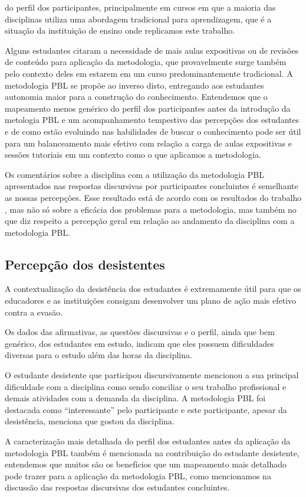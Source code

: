 do perfil dos participantes, principalmente em cursos em que a maioria
das disciplinas utiliza uma abordagem tradicional para aprendizagem, que
é a situação da instituição de ensino onde replicamos este trabalho.

Alguns estudantes citaram a necessidade de mais aulas
expositivas ou de revisões de conteúdo para aplicação
da metodologia, que provavelmente surge também pelo
contexto deles em estarem em um curso
predominantemente tradicional.
A metodologia \ac{PBL} se propõe ao inverso disto, entregando
aos estudantes autonomia maior para a construção
do conhecimento.
Entendemos que o mapeamento menos genérico do perfil
dos participantes antes da introdução da metologia \ac{PBL}
e um acompanhamento tempestivo das percepções dos estudantes
e de como estão evoluindo nas habilidades de buscar o conhecimento
pode ser útil para um balanceamento mais efetivo com
relação a carga de aulas expositivas e sessões tutoriais
em um contexto como o que aplicamos a metodologia.

Os comentários sobre a disciplina com a utilização da metodologia \ac{PBL}
apresentados nas respostas discursivas por participantes concluintes
é semelhante as nossas percepções.
Esse resultado está de acordo com os resultados do
trabalho \cite{sockalingam2011student}, mas não só sobre a eficácia
dos problemas para a metodologia, mas também no que diz respeito
a percepção geral em relação ao andamento da disciplina
com a metodologia \ac{PBL}.

\subsection{Percepção dos desistentes}

A contextualização da desistência dos estudantes é extremamente útil
para que os educadores e as instituições consigam desenvolver um
plano de ação mais efetivo contra a evasão.

Os dados das afirmativas, as questões discursivas e o perfil,
ainda que bem genérico, dos estudantes em estudo, indicam que
eles possuem dificuldades diversas para o estudo além
das horas da disciplina.

O estudante desistente que participou discursivamente mencionou a sua
principal dificuldade com a disciplina como sendo conciliar o
seu trabalho profissional e demais atividades com
a demanda da disciplina.
A metodologia \ac{PBL} foi destacada como ``interessante''
pelo participante e este participante, apesar da desistência,
menciona que gostou da disciplina.

A caracterização mais detalhada do perfil dos estudantes
antes da aplicação da metodologia \ac{PBL} também é mencionada
na contribuição do estudante desistente, entendemos
que muitos são os benefícios que um mapeamento mais detalhado
pode trazer para a aplicação da metodologia \ac{PBL}, como
mencionamos na discussão das respostas discursivas dos estudantes
concluintes.
